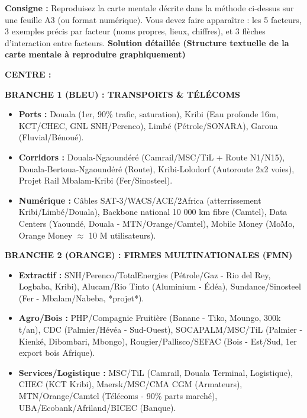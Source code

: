 \documentclass[11pt]{article}
\begin{document}
\begin{exoresolu}
\textbf{Consigne :} Reproduisez la carte mentale décrite dans la méthode ci-dessus sur une feuille A3 (ou format numérique). Vous devez faire apparaître : les 5 facteurs, 3 exemples précis par facteur (noms propres, lieux, chiffres), et 3 flèches d'interaction entre facteurs.
\tcblower
\textbf{Solution détaillée (Structure textuelle de la carte mentale à reproduire graphiquement)}

\textbf{CENTRE :} 

\textbf{BRANCHE 1 (BLEU) : TRANSPORTS \& TÉLÉCOMS}
\begin{itemize}
    \item \textbf{Ports :} Douala (1er, 90\% trafic, saturation), Kribi (Eau profonde 16m, KCT/CHEC, GNL SNH/Perenco), Limbé (Pétrole/SONARA), Garoua (Fluvial/Bénoué).
    \item \textbf{Corridors :} Douala-Ngaoundéré (Camrail/MSC/TiL + Route N1/N15), Douala-Bertoua-Ngaoundéré (Route), Kribi-Lolodorf (Autoroute 2x2 voies), Projet Rail Mbalam-Kribi (Fer/Sinosteel).
    \item \textbf{Numérique :} Câbles SAT-3/WACS/ACE/2Africa (atterrissement Kribi/Limbé/Douala), Backbone national 10 000 km fibre (Camtel), Data Centers (Yaoundé, Douala - MTN/Orange/Camtel), Mobile Money (MoMo, Orange Money $\approx$ 10 M utilisateurs).
\end{itemize}

\textbf{BRANCHE 2 (ORANGE) : FIRMES MULTINATIONALES (FMN)}
\begin{itemize}
    \item \textbf{Extractif :} SNH/Perenco/TotalEnergies (Pétrole/Gaz - Rio del Rey, Logbaba, Kribi), Alucam/Rio Tinto (Aluminium - Édéa), Sundance/Sinosteel (Fer - Mbalam/Nabeba, *projet*).
    \item \textbf{Agro/Bois :} PHP/Compagnie Fruitière (Banane - Tiko, Moungo, 300k t/an), CDC (Palmier/Hévéa - Sud-Ouest), SOCAPALM/MSC/TiL (Palmier - Kienké, Dibombari, Mbongo), Rougier/Pallisco/SEFAC (Bois - Est/Sud, 1er export bois Afrique).
    \item \textbf{Services/Logistique :} MSC/TiL (Camrail, Douala Terminal, Logistique), CHEC (KCT Kribi), Maersk/MSC/CMA CGM (Armateurs), MTN/Orange/Camtel (Télécoms - 90\% parts marché), UBA/Ecobank/Afriland/BICEC (Banque).
\end{itemize}


\end{exoresolu}
\end{document}
